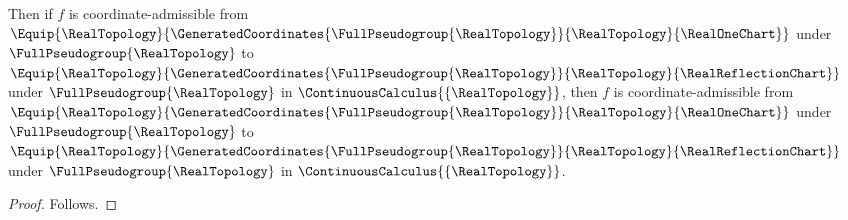 


\begin{theorem}\label{coordinate_map_closed_endpoint_probe}
    Then if $f$ is coordinate-admissible
        from $\Equip{\RealTopology}{\GeneratedCoordinates{\FullPseudogroup{\RealTopology}}{\RealTopology}{\RealOneChart}}$
        under $\FullPseudogroup{\RealTopology}$
        to $\Equip{\RealTopology}{\GeneratedCoordinates{\FullPseudogroup{\RealTopology}}{\RealTopology}{\RealReflectionChart}}$
        under $\FullPseudogroup{\RealTopology}$ in $\ContinuousCalculus{\{\RealTopology\}}$,
        then $f$ is coordinate-admissible
        from $\Equip{\RealTopology}{\GeneratedCoordinates{\FullPseudogroup{\RealTopology}}{\RealTopology}{\RealOneChart}}$
        under $\FullPseudogroup{\RealTopology}$
        to $\Equip{\RealTopology}{\GeneratedCoordinates{\FullPseudogroup{\RealTopology}}{\RealTopology}{\RealReflectionChart}}$
        under $\FullPseudogroup{\RealTopology}$ in $\ContinuousCalculus{\{\RealTopology\}}$.
\end{theorem}
\begin{proof}
    Follows.
\end{proof}
